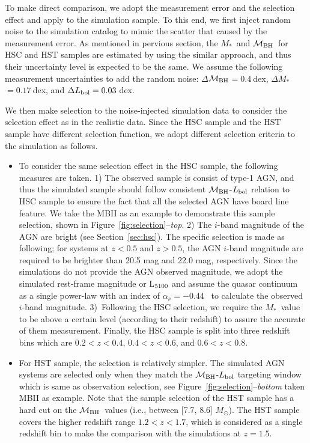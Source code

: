\documentclass[twocolumn]{aastex631}
\def\smass{{$M_*$}}
\def\mbh{$\mathcal M_{\rm BH}$}
\begin{document}
To make direct comparison, we adopt the measurement error and the selection effect and apply to the simulation sample. To this end, we first inject random noise to the simulation catalog to mimic the scatter that caused by the measurement error. As mentioned in pervious section, the \smass\ and \mbh\ for HSC and HST samples are estimated by using the similar approach, and thus their uncertainty level is expected to be the same. 
We assume the following measurement uncertainties to add the random noise: $\Delta$\mbh$ = 0.4~$dex, $\Delta$\smass$ = 0.17~$dex, and $\Delta L_{\rm bol} = 0.03~$dex. 

We then make selection to the noise-injected simulation data to consider the selection effect as in the realistic data. Since the HSC sample and the HST sample have different selection function, we adopt different selection criteria to the simulation as follows.
\begin{itemize}
 \item{}To consider the same selection effect in the HSC sample, the following measures are taken. 1) The observed sample is consist of type-1 AGN, and thus the simulated sample should follow consistent \mbh-$L_{\rm bol}$ relation to HSC sample to ensure the fact that all the selected AGN have board line feature. We take the MBII as an example to demonstrate this sample selection, shown in Figure~\ref{fig:selection}--{\it top}. 2) The $i$-band magnitude of the AGN are bright (see Section~\ref{sec:hsc}). The specific selection is made as following; for systems at $z<0.5$ and $z>0.5$, the AGN $i$-band magnitude are required to be brighter than 20.5 mag and 22.0 mag, respectively. Since the simulations do not provide the AGN observed magnitude, we adopt the simulated rest-frame magnitude or L$_{\rm 5100}$ and assume the quasar continuum as a single power-law with an index of $\alpha_\nu=-0.44$~\citep{2001AJ....122..549V} to calculate the observed $i$-band magnitude.
 3)~Following the HSC selection, we require the \smass\ value to be above a certain level (according to their redshift) to assure the accurate of them measurement. Finally, the HSC sample is split into three redshift bins which are $0.2<z<0.4$, $0.4<z<0.6$, and $0.6<z<0.8$.
 
\item{}For HST sample, the selection is relatively simpler. The simulated AGN systems are selected only when they match the  \mbh-$L_{\rm bol}$ targeting window which is same as observation selection, see Figure~\ref{fig:selection}--{\it bottom} taken MBII as example. Note that the sample selection of the HST sample has a hard cut on the \mbh\ values (i.e., between [7.7, 8.6] $M_{\odot}$). The HST sample covers the higher redshift range $1.2<z<1.7$, which is considered as a single redshift bin to make the comparison with the simulations at $z=1.5$.
\end{itemize}
\end{document}
